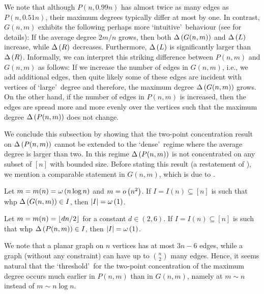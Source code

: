 We note that although $P(n,0.99n)$ has almost twice as many edges as $P(n,0.51n)$, their maximum degrees typically differ at most by one. In contrast, $G(n,m)$ exhibits the following perhaps more \lq intuitive\rq\ behaviour (see  for details): If the average degree $2m/n$ grows, then both $\Delta\left(G(n,m)\right)$ and $\Delta\left(L\right)$ increase, while $\Delta\left(R\right)$ decreases. Furthermore, $\Delta\left(L\right)$ is significantly larger than $\Delta\left(R\right)$. Informally, we can interpret this striking difference between $P(n,m)$ and $G(n,m)$ as follows: If we increase the number of edges in $G(n,m)$, i.e., we add additional edges, then quite likely some of these edges are incident with vertices of \lq large\rq\ degree and therefore, the maximum degree $\Delta\left(G(n,m)\right)$ grows. On the other hand, if the number of edges in $P(n,m)$ is increased, then the edges are spread more and more evenly over the vertices such that the maximum degree $\Delta\left(P(n,m)\right)$ does not change.

We conclude this subsection by showing that the two-point concentration result on $\Delta\left(P(n,m)\right)$ cannot be extended to the \lq dense\rq\ regime where the average degree is larger than two. In this regime $\Delta\left(P(n,m)\right)$ is not concentrated on any subset of $[n]$ with bounded size. Before stating this result (a restatement of ), we mention a comparable statement in $G(n,m)$, which is due to \Bollobas \cite{Bollobas1982}.

\begin{thm}
Let $m=m(n)=\omega\left(n\log n\right)$ and $m=o\left(n^2\right)$. If $I=I(n)\subseteq[n]$ is such that whp $\Delta\left(G(n,m)\right)\in I$, then $|I|=\omega\left(1\right)$.
\end{thm}

\begin{thm}\label{thm:non_concentration}
Let $m=m(n)=\left\lfloor dn/2\right\rfloor$ for a constant $d \in (2,6)$. If $I=I(n)\subseteq[n]$ is such that whp $\Delta\left(P(n,m)\right)\in I$, then $|I|=\omega\left(1\right)$. 
\end{thm}

We note that a planar graph on $n$ vertices has at most $3n-6$ edges, while a graph (without any constraint) can have up to $\binom{n}{2}$ many edges. Hence, it seems natural that the \lq threshold\rq\ for the two-point concentration of the maximum degree occurs much earlier in $P(n,m)$ than in $G(n,m)$, namely at $m\sim n$ instead of $m\sim n \log n$.

